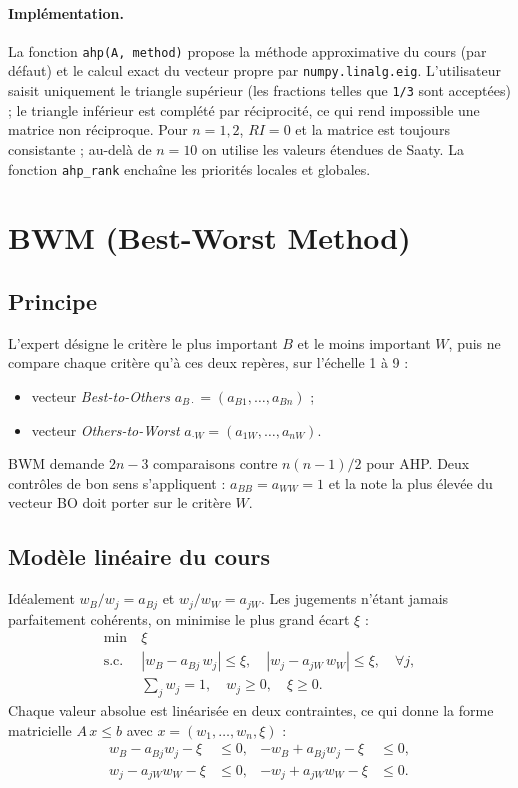 \documentclass[11pt,a4paper]{report}
\theoremstyle{definition}
\theoremstyle{remark}
\begin{document}
\paragraph{Implémentation.} La fonction \texttt{ahp(A, method)} propose la méthode approximative du cours
(par défaut) et le calcul exact du vecteur propre par \texttt{numpy.linalg.eig}. L'utilisateur saisit
uniquement le triangle supérieur (les fractions telles que \texttt{1/3} sont acceptées) ; le triangle
inférieur est complété par réciprocité, ce qui rend impossible une matrice non réciproque. Pour $n=1,2$,
$RI=0$ et la matrice est toujours consistante ; au-delà de $n=10$ on utilise les valeurs étendues de Saaty.
La fonction \texttt{ahp\_rank} enchaîne les priorités locales et globales.

\section{BWM (Best-Worst Method)}

\subsection{Principe}
L'expert désigne le critère le plus important $B$ et le moins important $W$, puis ne compare chaque critère
qu'à ces deux repères, sur l'échelle 1 à 9 :
\begin{itemize}
  \item vecteur \emph{Best-to-Others} $a_{B\cdot}=(a_{B1},\dots,a_{Bn})$ ;
  \item vecteur \emph{Others-to-Worst} $a_{\cdot W}=(a_{1W},\dots,a_{nW})$.
\end{itemize}
BWM demande $2n-3$ comparaisons contre $n(n-1)/2$ pour AHP. Deux contrôles de bon sens s'appliquent :
$a_{BB}=a_{WW}=1$ et la note la plus élevée du vecteur BO doit porter sur le critère $W$.

\subsection{Modèle linéaire du cours}
Idéalement $w_B/w_j=a_{Bj}$ et $w_j/w_W=a_{jW}$. Les jugements n'étant jamais parfaitement cohérents, on
minimise le plus grand écart $\xi$ :
\begin{equation}
\begin{aligned}
  \min\ & \xi\\
  \text{s.c. }& |w_B-a_{Bj}\,w_j|\le\xi,\quad |w_j-a_{jW}\,w_W|\le\xi,\quad \forall j,\\
  & \textstyle\sum_j w_j=1,\quad w_j\ge 0,\quad \xi\ge 0.
\end{aligned}
\end{equation}
Chaque valeur absolue est linéarisée en deux contraintes, ce qui donne la forme matricielle
$A\,x\le b$ avec $x=(w_1,\dots,w_n,\xi)$ :
\begin{equation}
\begin{aligned}
  w_B-a_{Bj}w_j-\xi&\le 0, & -w_B+a_{Bj}w_j-\xi&\le 0,\\
  w_j-a_{jW}w_W-\xi&\le 0, & -w_j+a_{jW}w_W-\xi&\le 0.
\end{aligned}
\end{equation}
\end{document}
